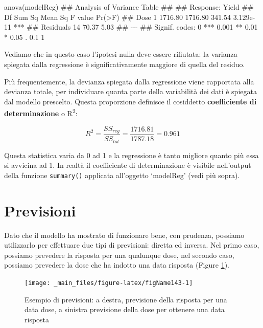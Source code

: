 \documentclass[a4paper,12pt,oneside]{book}
\newenvironment{Shaded}{\begin{snugshade}}{\end{snugshade}}
\newcommand{\DocumentationTok}[1]{#1}
\newcommand{\FunctionTok}[1]{#1}
\newcommand{\NormalTok}[1]{#1}
\begin{document}
\begin{Shaded}
\begin{Highlighting}[]
\FunctionTok{anova}\NormalTok{(modelReg)}
\DocumentationTok{\#\# Analysis of Variance Table}
\DocumentationTok{\#\# }
\DocumentationTok{\#\# Response: Yield}
\DocumentationTok{\#\#           Df  Sum Sq Mean Sq F value    Pr(\textgreater{}F)    }
\DocumentationTok{\#\# Dose       1 1716.80 1716.80  341.54 3.129e{-}11 ***}
\DocumentationTok{\#\# Residuals 14   70.37    5.03                      }
\DocumentationTok{\#\# {-}{-}{-}}
\DocumentationTok{\#\# Signif. codes:  0 \textquotesingle{}***\textquotesingle{} 0.001 \textquotesingle{}**\textquotesingle{} 0.01 \textquotesingle{}*\textquotesingle{} 0.05 \textquotesingle{}.\textquotesingle{} 0.1 \textquotesingle{} \textquotesingle{} 1}
\end{Highlighting}
\end{Shaded}

Vediamo che in questo caso l'ipotesi nulla deve essere rifiutata: la varianza spiegata dalla regressione è significativamente maggiore di quella del residuo.

Più frequentemente, la devianza spiegata dalla regressione viene rapportata alla devianza totale, per individuare quanta parte della variabilità dei dati è spiegata dal modello prescelto. Questa proporzione definisce il cosiddetto \textbf{coefficiente di determinazione} o R\textsuperscript{2}:

\[R^2 = \frac{SS_{reg}}{SS_{tot}} = \frac{1716.81}{1787.18} = 0.961\]

Questa statistica varia da 0 ad 1 e la regressione è tanto migliore quanto più essa si avvicina ad 1. In realtà il coefficiente di determinazione è visibile nell'output della funzione \texttt{summary()} applicata all'oggetto `modelReg' (vedi più sopra).

\hypertarget{previsioni}{%
\section{Previsioni}\label{previsioni}}

Dato che il modello ha mostrato di funzionare bene, con prudenza, possiamo utilizzarlo per effettuare due tipi di previsioni: diretta ed inversa. Nel primo caso, possiamo prevedere la risposta per una qualunque dose, nel secondo caso, possiamo prevedere la dose che ha indotto una data risposta (Figure \ref{fig:figName143}).

\begin{figure}

{\centering \texttt{[image: \_main\_files/figure-latex/figName143-1]} 

}

\caption{Esempio di previsioni: a destra, previsione della risposta per una data dose, a sinistra previsione della dose per ottenere una data risposta}\label{fig:figName143}
\end{figure}
\end{document}
